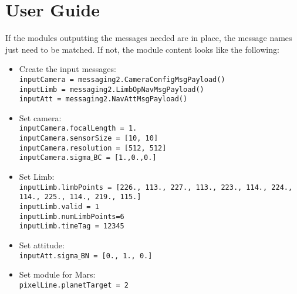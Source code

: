 
\section{User Guide}
If the modules outputting the messages needed are in place, the message names just need to be matched. If not, the module content looks like the following:

\begin{itemize}
\item Create the input messages: \\
\texttt{inputCamera = messaging2.CameraConfigMsgPayload()} \\
\texttt{inputLimb = messaging2.LimbOpNavMsgPayload()}\\
\texttt{inputAtt = messaging2.NavAttMsgPayload()}\\
\item Set camera: \\
\texttt{inputCamera.focalLength = 1.}\\
\texttt{inputCamera.sensorSize = [10, 10]}\\
\texttt{inputCamera.resolution = [512, 512]}\\
\texttt{inputCamera.sigma$\_$BC = [1.,0.,0.]}\\
\item Set Limb: \\
\texttt{inputLimb.limbPoints = [226., 113., 227., 113., 223., 114., 224., 114., 225., 114., 219.,
       115.]}\\
\texttt{inputLimb.valid = 1}\\
\texttt{inputLimb.numLimbPoints=6}\\
\texttt{inputLimb.timeTag = 12345}\\
\item Set attitude: \\
\texttt{inputAtt.sigma$\_$BN = [0., 1., 0.]}\\
\item Set module for Mars: \\
\texttt{pixelLine.planetTarget = 2}\\
  \end{itemize}